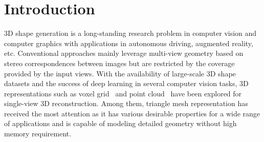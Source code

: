 \section{Introduction}

3D shape generation is a long-standing research problem in computer vision and computer graphics with applications in autonomous driving, augmented reality, etc. Conventional approaches mainly leverage multi-view geometry based on stereo correspondences between images but are restricted by the coverage provided by the input views. With the availability of large-scale 3D shape datasets and the success of deep learning in several computer vision tasks, 3D representations such as voxel grid~\cite{3dr2n2, tulsiani2017multi, yan2016perspective} and point cloud~\cite{yang2018foldingnet, fan2017point} have been explored for single-view 3D reconstruction.
Among them, triangle mesh representation has received the most attention as it has various desirable properties for a wide range of applications and is capable of modeling detailed geometry without high memory requirement.

